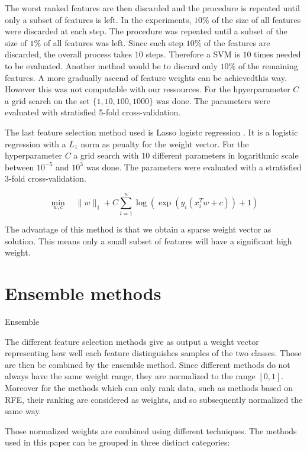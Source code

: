\documentclass[twoside,11pt]{article}
\begin{document}
The worst ranked features are then discarded and the procedure is repeated until only a subset of features is left. In the experiments, $10\%$ of the size of all features were discarded at each step. The procedure was repeated until a subset of the size of $1\%$ of all features was left. Since each step $10\%$ of the features are discarded, the overall process takes $10$ steps. Therefore a SVM is $10$ times needed to be evaluated. Another method would be to discard only $10\%$ of the remaining features. A more gradually ascend of feature weights can be achievedthis way. However this was not computable with our ressources. For the hpyerparameter $C$ a grid search on the set $\{1, 10, 100, 1000\}$ was done. The parameters were evaluated with stratisfied 5-fold cross-validation.

The last feature selection method used is Lasso logistc regression \citep{wheeler2010lasso}. It is a logistic regression with a $L_1$ norm as penalty for the weight vector. For the hyperparameter $C$ a grid search with $10$ different parameters in logarithmic scale between $10^{-5}$ and $10^3$ was done. The parameters were evaluated with a stratisfied 3-fold cross-validation.

\begin{equation}
  \min_{w,c} \quad \|w\|_1 + C\sum_{i=1}^n \log(\exp(y_i(x_i^Tw + c))+1)
\end{equation}

The advantage of this method is that we obtain a sparse weight vector as solution. This means only a small subset of features will have a significant high weight.
\section{Ensemble methods}

Ensemble

The different feature selection methods give as output a weight vector representing how well each feature distinguishes samples of the two classes. Those are then be combined by the ensemble method. Since different methods do not always have the same weight range, they are normalized to the range $[0,1]$. Moreover for the methods which can only rank data, such as methods based on RFE, their ranking are considered as weights, and so subsequently normalized the same way. 

Those normalized weights are combined using different techniques. The methods used in this paper can be grouped in three distinct categories: 
\end{document}
